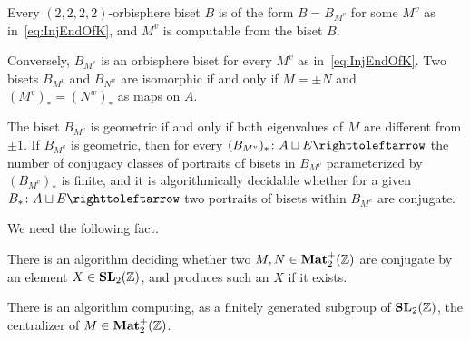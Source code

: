 \documentclass{amsart}
\begin{document}
\begin{prop}\label{prop:bis:2222}
  Every $(2,2,2,2)$-orbisphere biset $B$ is of the form $B=B_{M^v}$
  for some $M^v$ as in~\eqref{eq:InjEndOfK}, and $M^v$ is computable
  from the biset $B$.

  Conversely, $B_{M^v}$ is an orbisphere biset for every $M^v$ as
  in~\eqref{eq:InjEndOfK}. Two bisets $B_{M^v}$ and $B_{N^w}$ are
  isomorphic if and only if $M=\pm N$ and $(M^v)_*=(N^w)_*$ as maps on
  $A$.

  The biset $B_{M^{v}}$ is geometric if and only if both eigenvalues
  of $M$ are different from $\pm 1$. If $B_{M^{v}}$ is geometric, then
  for every $(B_{M^{v}})_*\colon A\sqcup E\selfmap$ the number of
  conjugacy classes of portraits of bisets in $B_{M^{v}}$
  parameterized by $(B_{M^{v}})_*$ is finite, and it is
  algorithmically decidable whether for a given
  $B_*\colon A\sqcup E\selfmap$ two portraits of bisets within
  $B_{M^v}$ are conjugate.
\end{prop} 

\noindent We need the following fact.
\begin{thm}\label{thm:MatrConj}
  There is an algorithm deciding whether two $M,N\in \mathbf{Mat}_2^+({\mathbb Z})$ are
  conjugate by an element $X\in \mathbf{SL}_2({\mathbb Z})$, and produces such an $X$
  if it exists.
 
  There is an algorithm computing, as a finitely generated subgroup of
  $\mathbf{SL}_2({\mathbb Z})$, the centralizer of $M\in \mathbf{Mat}_2^+({\mathbb Z})$.
\end{thm}
\end{document}
